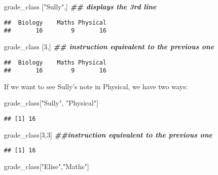 \documentclass[
]{article}
\newenvironment{Shaded}{\begin{snugshade}}{\end{snugshade}}
\newcommand{\DecValTok}[1]{\textcolor[rgb]{0.00,0.00,0.81}{#1}}
\newcommand{\DocumentationTok}[1]{\textcolor[rgb]{0.56,0.35,0.01}{\textbf{\textit{#1}}}}
\newcommand{\NormalTok}[1]{#1}
\newcommand{\StringTok}[1]{\textcolor[rgb]{0.31,0.60,0.02}{#1}}
\begin{document}
\begin{Shaded}
\begin{Highlighting}[]
\NormalTok{grade\_class [}\StringTok{"Sully"}\NormalTok{,] }\DocumentationTok{\#\# displays the 3rd line}
\end{Highlighting}
\end{Shaded}

\begin{verbatim}
##  Biology    Maths Physical 
##       16        9       16
\end{verbatim}

\begin{Shaded}
\begin{Highlighting}[]
\NormalTok{grade\_class [}\DecValTok{3}\NormalTok{,] }\DocumentationTok{\#\# instruction equivalent to the previous one}
\end{Highlighting}
\end{Shaded}

\begin{verbatim}
##  Biology    Maths Physical 
##       16        9       16
\end{verbatim}

If we want to see Sully's note in Physical, we have two ways:

\begin{Shaded}
\begin{Highlighting}[]
\NormalTok{grade\_class[}\StringTok{"Sully"}\NormalTok{, }\StringTok{"Physical"}\NormalTok{]}
\end{Highlighting}
\end{Shaded}

\begin{verbatim}
## [1] 16
\end{verbatim}

\begin{Shaded}
\begin{Highlighting}[]
\NormalTok{grade\_class[}\DecValTok{3}\NormalTok{,}\DecValTok{3}\NormalTok{] }\DocumentationTok{\#\#instruction equivalent to the previous one}
\end{Highlighting}
\end{Shaded}

\begin{verbatim}
## [1] 16
\end{verbatim}

\begin{Shaded}
\begin{Highlighting}[]
\NormalTok{grade\_class[}\StringTok{"Elise"}\NormalTok{,}\StringTok{"Maths"}\NormalTok{]}
\end{Highlighting}
\end{Shaded}
\end{document}
